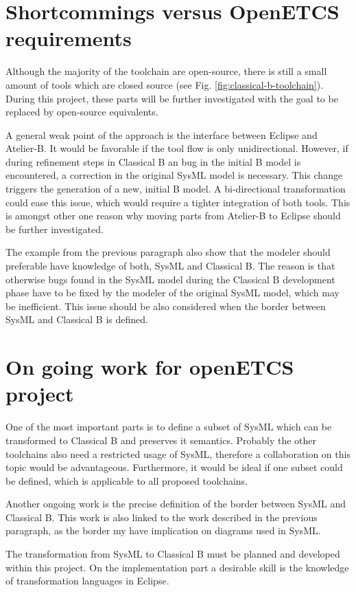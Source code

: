 \section{Shortcommings versus OpenETCS requirements}

Although the majority of the toolchain are open-source, there is still
a small amount of tools which are closed source (see
Fig. \ref{fig:classical-b-toolchain}). During this project, these
parts will be further investigated with the goal to be replaced by
open-source equivalents.

A general weak point of the approach is the interface between Eclipse
and Atelier-B. It would be favorable if the tool flow is only
unidirectional. However, if during refinement steps in Classical B an
bug in the initial B model is encountered, a correction in the
original SysML model is necessary. This change triggers the generation
of a new, initial B model. A bi-directional transformation could ease
this issue, which would require a tighter integration of both
tools. This is amongst other one reason why moving parts from
Atelier-B to Eclipse should be further investigated.

The example from the previous paragraph also show that the modeler
should preferable have knowledge of both, SysML and Classical B. The
reason is that otherwise bugs found in the SysML model during the
Classical B development phase have to be fixed by the modeler of the
original SysML model, which may be inefficient. This issue should be
also considered when the border between SysML and Classical B is
defined.

\section{On going work for openETCS project}

One of the most important parts is to define a subset of SysML which
can be transformed to Classical B and preserves it semantics. Probably
the other toolchains also need a restricted usage of SysML, therefore
a collaboration on this topic would be advantageous. Furthermore, it
would be ideal if one subset could be defined, which is applicable to
all proposed toolchains.

Another ongoing work is the precise definition of the border between
SysML and Classical B. This work is also linked to the work described
in the previous paragraph, as the border my have implication on
diagrams used in SysML.

The transformation from SysML to Classical B must be planned and
developed within this project. On the implementation part a desirable
skill is the knowledge of transformation languages in Eclipse.

